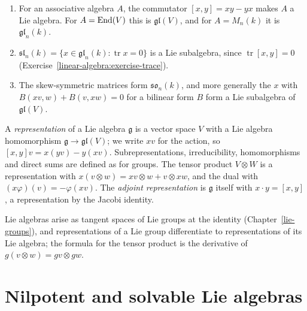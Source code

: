 \begin{example}\label{representation-theory:example-lie-algebras}
\begin{enumerate}
\item For an associative algebra $A$, the commutator $[x, y] = xy - yx$ makes $A$ a Lie algebra. For $A = \operatorname{End}(V)$
this is $\mathfrak{gl}(V)$, and for $A = M_n(k)$ it is $\mathfrak{gl}_n(k)$.
\item $\mathfrak{sl}_n(k) = \{x \in \mathfrak{gl}_n(k) : \operatorname{tr} x = 0\}$ is a Lie subalgebra, since
$\operatorname{tr}[x, y] = 0$ (Exercise~\ref{linear-algebra:exercise-trace}).
\item The skew-symmetric matrices form $\mathfrak{so}_n(k)$, and more generally the $x$ with $B(xv, w) + B(v, xw) = 0$
for a bilinear form $B$ form a Lie subalgebra of $\mathfrak{gl}(V)$.
\end{enumerate}
\end{example}

\begin{definition}\label{representation-theory:definition-lie-representation}
A \emph{representation} of a Lie algebra $\mathfrak{g}$ is a vector space $V$ with a Lie algebra homomorphism
$\mathfrak{g} \to \mathfrak{gl}(V)$; we write $xv$ for the action, so $[x, y]v = x(yv) - y(xv)$. Subrepresentations,
irreducibility, homomorphisms and direct sums are defined as for groups. The tensor product $V \otimes W$ is a
representation with $x(v \otimes w) = xv \otimes w + v \otimes xw$, and the dual with $(x\varphi)(v) = -\varphi(xv)$. The
\emph{adjoint representation} is $\mathfrak{g}$ itself with $x \cdot y = [x, y]$, a representation by the Jacobi
identity.
\end{definition}

\begin{remark}\label{representation-theory:remark-lie-groups-algebras}
Lie algebras arise as tangent spaces of Lie groups at the identity (Chapter~\ref{lie-groups}), and
representations of a Lie group differentiate to representations of its Lie algebra; the formula for the tensor
product is the derivative of $g(v \otimes w) = gv \otimes gw$.
\end{remark}

\section{Nilpotent and solvable Lie algebras}\label{representation-theory:section-solvable}

